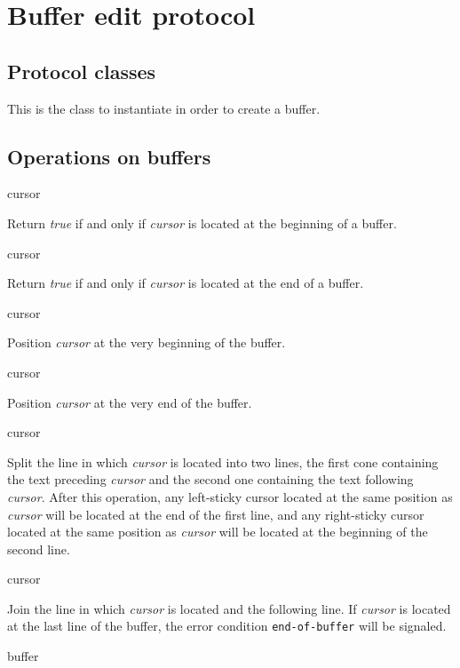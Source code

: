 \section{Buffer edit protocol}
\label{sec-buffer-edit-protocol}

\subsection{Protocol classes}


This is the class to instantiate in order to create a buffer.

\subsection{Operations on buffers}

 {cursor}

Return \textit{true} if and only if \textit{cursor} is located at the
beginning of a buffer.

 {cursor}

Return \textit{true} if and only if \textit{cursor} is located at the
end of a buffer.

 {cursor}

Position \textit{cursor} at the very beginning of the buffer.

 {cursor}

Position \textit{cursor} at the very end of the buffer.

 {cursor}

Split the line in which \textit{cursor} is located into two lines, the
first cone containing the text preceding \textit{cursor} and the
second one containing the text following \textit{cursor}.  After this
operation, any left-sticky cursor located at the same position as
\textit{cursor} will be located at the end of the first line, and any
right-sticky cursor located at the same position as \textit{cursor}
will be located at the beginning of the second line.

 {cursor}

Join the line in which \textit{cursor} is located and the following
line.  If \textit{cursor} is located at the last line of the buffer,
the error condition \texttt{end-of-buffer} will be signaled.

 {buffer}

